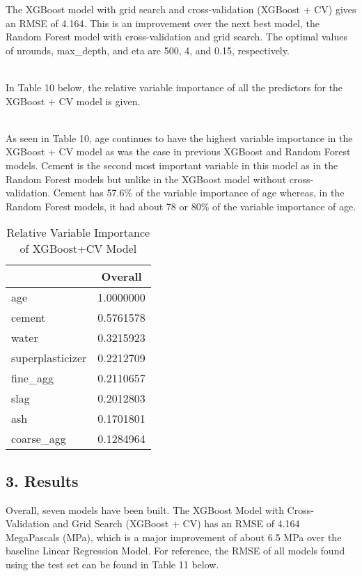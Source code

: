 \documentclass[
]{article}
\begin{document}
The XGBoost model with grid search and cross-validation (XGBoost + CV)
gives an RMSE of 4.164. This is an improvement over the next best model,
the Random Forest model with cross-validation and grid search. The
optimal values of nrounds, max\_depth, and eta are 500, 4, and 0.15,
respectively.\\
\strut \\
In Table 10 below, the relative variable importance of all the
predictors for the XGBoost + CV model is given.\\
\strut \\
As seen in Table 10, age continues to have the highest variable
importance in the XGBoost + CV model as was the case in previous XGBoost
and Random Forest models. Cement is the second most important variable
in this model as in the Random Forest models but unlike in the XGBoost
model without cross-validation. Cement has 57.6\% of the variable
importance of age whereas, in the Random Forest models, it had about 78
or 80\% of the variable importance of age.

\begin{table}[H]

\caption{\label{tab:Variable Importance - XGB+CV}Relative Variable Importance of XGBoost+CV Model}
\centering
\fontsize{11}{13}\selectfont
\begin{tabular}[t]{|>{}l|||>{}c|}
\hline
  & Overall\\
\hline
age & 1.0000000\\
\hline
cement & 0.5761578\\
\hline
water & 0.3215923\\
\hline
superplasticizer & 0.2212709\\
\hline
fine\_agg & 0.2110657\\
\hline
slag & 0.2012803\\
\hline
ash & 0.1701801\\
\hline
coarse\_agg & 0.1284964\\
\hline
\end{tabular}
\end{table}

\hypertarget{results}{%
\subsection{3. Results}\label{results}}

Overall, seven models have been built. The XGBoost Model with
Cross-Validation and Grid Search (XGBoost + CV) has an RMSE of 4.164
MegaPascals (MPa), which is a major improvement of about 6.5 MPa over
the baseline Linear Regression Model. For reference, the RMSE of all
models found using the test set can be found in Table 11 below.
\end{document}
